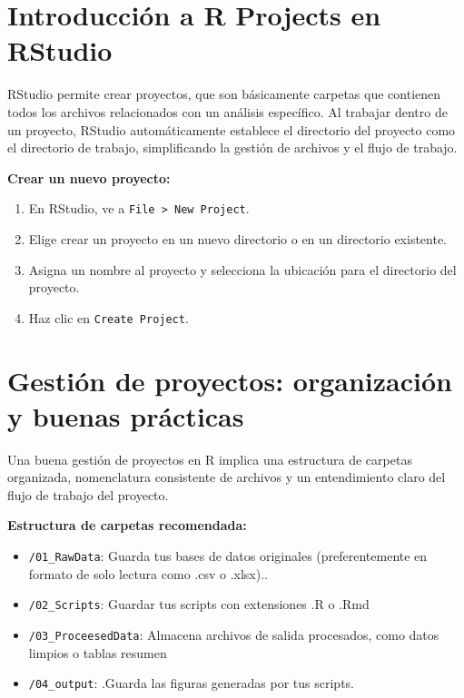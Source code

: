 \documentclass[
]{book}
\providecommand{\tightlist}{%
  \setlength{\itemsep}{0pt}\setlength{\parskip}{0pt}}
\begin{document}
\hypertarget{introducciuxf3n-a-r-projects-en-rstudio}{%
\section{Introducción a R Projects en RStudio}\label{introducciuxf3n-a-r-projects-en-rstudio}}

RStudio permite crear proyectos, que son básicamente carpetas que contienen todos los archivos relacionados con un análisis específico. Al trabajar dentro de un proyecto, RStudio automáticamente establece el directorio del proyecto como el directorio de trabajo, simplificando la gestión de archivos y el flujo de trabajo.

\textbf{Crear un nuevo proyecto:}

\begin{enumerate}
\def\labelenumi{\arabic{enumi}.}
\tightlist
\item
  En RStudio, ve a \texttt{File\ \textgreater{}\ New\ Project}.
\item
  Elige crear un proyecto en un nuevo directorio o en un directorio existente.
\item
  Asigna un nombre al proyecto y selecciona la ubicación para el directorio del proyecto.
\item
  Haz clic en \texttt{Create\ Project}.
\end{enumerate}

\hypertarget{gestiuxf3n-de-proyectos-organizaciuxf3n-y-buenas-pruxe1cticas}{%
\section{Gestión de proyectos: organización y buenas prácticas}\label{gestiuxf3n-de-proyectos-organizaciuxf3n-y-buenas-pruxe1cticas}}

Una buena gestión de proyectos en R implica una estructura de carpetas organizada, nomenclatura consistente de archivos y un entendimiento claro del flujo de trabajo del proyecto.

\textbf{Estructura de carpetas recomendada:}

\begin{itemize}
\tightlist
\item
  \texttt{/01\_RawData}: Guarda tus bases de datos originales (preferentemente en formato de solo lectura como .csv o .xlsx)..
\item
  \texttt{/02\_Scripts}: Guardar tus scripts con extensiones .R o .Rmd
\item
  \texttt{/03\_ProceesedData}: Almacena archivos de salida procesados, como datos limpios o tablas resumen
\item
  \texttt{/04\_output}: .Guarda las figuras generadas por tus scripts.
\end{itemize}
\end{document}
